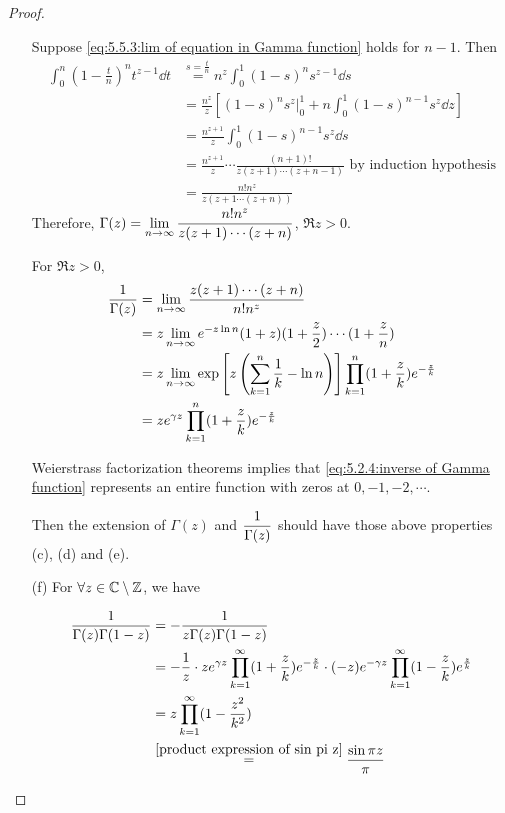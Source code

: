 \begin{proof}
\begin{enumerate}[label=(\alph*)]
        Suppose \eqref{eq:5.5.3:lim of equation in Gamma function} holds for  $ n-1 $. Then 
        \begin{equation}
            \begin{aligned}
                \int_0^n(1-\frac{t}{n})^nt^{z-1}\dd t&\overset{s=\frac{t}{n}}{=}n^z\int_0^1(1-s)^ns^{z-1}\dd s \\
                &=\frac{n^z}{z}\left[(1-s)^ns^z|^1_0+n\int_0^1(1-s)^{n-1}s^z\dd z\right]\\
                &=\frac{n^{z+1}}{z}\int_0^1(1-s)^{n-1}s^z\dd s\\
                &=\frac{n^{z+1}}{z}\cdots\frac{(n+1)!}{z(z+1)\cdots(z+n-1)}\text{ by induction hypothesis}\\
                &=\frac{n!n^z}{z(z+1\cdots(z+n))}
            \end{aligned}
        \end{equation} 
        Therefore,  $ \Gamma(z)=\displaystyle\lim_{n\to\infty}\frac{n!n^z}{z(z+1)\cdots(z+n)} $,  $ \Re z>0 $.

        For  $ \Re z>0  $,  
        \begin{align}
            \displaystyle\frac{1}{\Gamma(z)}&=\lim_{n\to\infty}\frac{z(z+1)\cdots(z+n)}{n!n^z}\notag\\
            &=z\lim_{n\to\infty}e^{-z\ln n}(1+z)(1+\displaystyle\frac{z}{2})\cdots(1+\frac{z}{n})\notag\\
            &=z\lim_{n\to\infty}\exp\left[z\left(\sum_{k=1}^n\frac{1}{k}-\ln n\right)\right]\prod_{k=1}^n(1+\frac{z}{k})e^{-\frac{z}{k}}\notag\\
            &=ze^{\gamma z}\prod_{k=1}^n(1+\frac{z}{k})e^{-\frac{z}{k}}\label{eq:5.2.4:inverse of Gamma function}
        \end{align}
        
        Weierstrass factorization theorems implies that \eqref{eq:5.2.4:inverse of Gamma function} represents an entire function with zeros at  $ 0,-1,-2,\cdots $.
        
        Then the extension of  $ \Gamma(z) $ and  $ \displaystyle\frac{1}{\Gamma(z)} $ should have those above properties (c), (d) and (e). 

        \item[(f)] For  $ \forall z\in \mathbb C\setminus\mathbb Z $, we have 
        
        \begin{equation}
            \begin{aligned}
                \frac{1}{\Gamma(z)\Gamma(1-z)}&=-\frac{1}{z\Gamma(z)\Gamma(1-z)}\\
                &=-\frac{1}{z}\cdot z e^{\gamma z}\prod_{k=1}^\infty (1+\frac{z}{k})e^{-\frac{z}{k}}\cdot(-z)e^{-\gamma z}\prod_{k=1}^\infty(1-\frac{z}{k})e^{\frac{z}{k}}\\
                &=z\prod_{k=1}^\infty(1-\frac{z^2}{k^2})\\
                &\overset{\eqref{product expression of sin pi z}}{=}\frac{\sin \pi z}{\pi}
            \end{aligned}
        \end{equation} 
    \end{enumerate} 
\end{proof}

